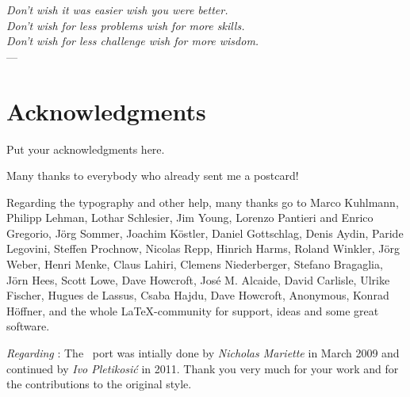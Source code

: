 
\begin{flushright}{\slshape
    Don’t wish it was easier wish you were better. \\
    Don’t wish for less problems wish for more skills. \\
    Don’t wish for less challenge wish for more wisdom.} \\ \medskip
    --- 
\end{flushright}



\bigskip

\begingroup
\let\clearpage\relax
\let\cleardoublepage\relax
\let\cleardoublepage\relax
\chapter*{Acknowledgments}
Put your acknowledgments here.

Many thanks to everybody who already sent me a postcard!

Regarding the typography and other help, many thanks go to Marco
Kuhlmann, Philipp Lehman, Lothar Schlesier, Jim Young, Lorenzo
Pantieri and Enrico Gregorio, J\"org Sommer,
Joachim K\"ostler, Daniel Gottschlag, Denis Aydin, Paride
Legovini, Steffen Prochnow, Nicolas Repp, Hinrich Harms,
Roland Winkler, Jörg Weber, Henri Menke, Claus Lahiri,
Clemens Niederberger, Stefano Bragaglia, Jörn Hees,
Scott Lowe, Dave Howcroft, Jos\'e M. Alcaide, David Carlisle,
Ulrike Fischer, Hugues de Lassus, Csaba Hajdu, Dave Howcroft,
Anonymous, Konrad Höffner, 
and the whole \LaTeX-community for support, ideas and
some great software.

\bigskip

\noindent\emph{Regarding \mLyX}: The \mLyX\ port was intially done by
\emph{Nicholas Mariette} in March 2009 and continued by
\emph{Ivo Pletikosi\'c} in 2011. Thank you very much for your
work and for the contributions to the original style.


\endgroup
